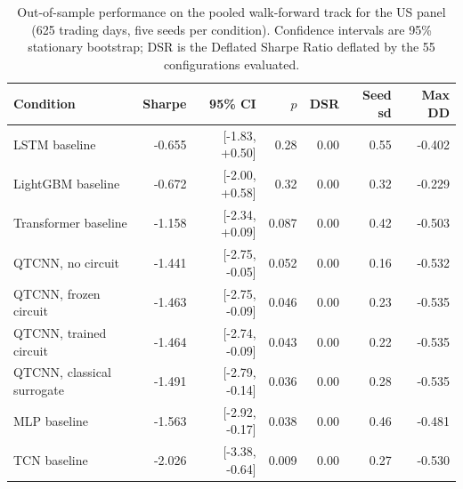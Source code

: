 \begin{table}[t]
\centering
\caption{Out-of-sample performance on the pooled walk-forward track for the US panel (\num{625} trading days, five seeds per condition). Confidence intervals are 95\% stationary bootstrap; DSR is the Deflated Sharpe Ratio deflated by the \num{55} configurations evaluated.}
\label{tab:headline-us}
\small
\begin{tabular}{lrrrrrr}
\toprule
Condition & Sharpe & 95\% CI & $p$ & DSR & Seed sd & Max DD \\
\midrule
LSTM baseline & -0.655 & [-1.83, +0.50] & 0.28 & 0.00 & 0.55 & -0.402 \\
LightGBM baseline & -0.672 & [-2.00, +0.58] & 0.32 & 0.00 & 0.32 & -0.229 \\
Transformer baseline & -1.158 & [-2.34, +0.09] & 0.087 & 0.00 & 0.42 & -0.503 \\
QTCNN, no circuit & -1.441 & [-2.75, -0.05] & 0.052 & 0.00 & 0.16 & -0.532 \\
QTCNN, frozen circuit & -1.463 & [-2.75, -0.09] & 0.046 & 0.00 & 0.23 & -0.535 \\
QTCNN, trained circuit & -1.464 & [-2.74, -0.09] & 0.043 & 0.00 & 0.22 & -0.535 \\
QTCNN, classical surrogate & -1.491 & [-2.79, -0.14] & 0.036 & 0.00 & 0.28 & -0.535 \\
MLP baseline & -1.563 & [-2.92, -0.17] & 0.038 & 0.00 & 0.46 & -0.481 \\
TCN baseline & -2.026 & [-3.38, -0.64] & 0.009 & 0.00 & 0.27 & -0.530 \\
\bottomrule
\end{tabular}
\end{table}
